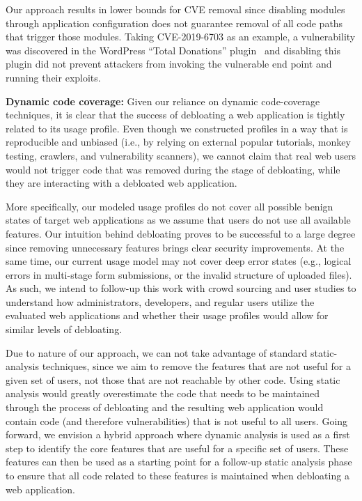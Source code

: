 Our approach results in lower bounds for CVE removal since disabling modules through application configuration does not guarantee removal of all code paths that trigger those modules. Taking CVE-2019-6703 as an example, a vulnerability was discovered in the WordPress ``Total Donations'' plugin~\cite{wordpressPlugin} and disabling this plugin did not prevent attackers from invoking the vulnerable end point and running their exploits.

\vspace{1ex}
\noindent\textbf{Dynamic code coverage:}  Given our reliance on dynamic
code-coverage techniques, it is clear that the success of debloating a web application
is tightly related to its usage profile. Even though we constructed profiles
in a way that is reproducible and unbiased (i.e., by relying on external
popular tutorials, monkey testing, crawlers, and vulnerability scanners), we cannot claim that
real web users would not trigger code that was removed during the stage of
debloating, while they are interacting with a debloated web application.

More specifically, our modeled usage profiles do not cover all possible benign states of target web applications as we assume that users do not use all available features.
Our intuition behind debloating proves to be successful to a large degree since removing unnecessary features brings clear security improvements.
At the same time, our current usage model may not cover deep error states (e.g., logical errors in multi-stage form submissions, or the invalid structure of uploaded files).
As such, we intend to follow-up this work with crowd sourcing and user studies
to understand how administrators, developers, and regular users utilize the
evaluated web applications and whether their usage profiles would allow for
similar levels of debloating.

Due to nature of our approach, we can not take advantage of standard
static-analysis techniques, since we aim to remove the features that are
not useful for a given set of users, not those that are not reachable by
other code. Using static analysis would greatly overestimate the code that
needs to be maintained through the process of debloating and the resulting
web application would contain code (and therefore vulnerabilities) that is
not useful to all users. Going forward, we envision a hybrid approach where
dynamic analysis is used as a first step to identify the core features that
are useful for a specific set of users. These features can then be used as
a starting point for a follow-up static analysis phase to ensure that all
code related to these features is maintained when debloating a web application.

